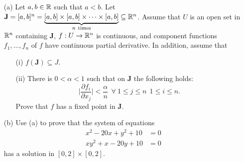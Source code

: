 \documentclass[a4paper]{article}
\begin{document}
\begin{problem}
   \begin{enumerate}
       \item[(a)] Let \( a,b \in \mathbb{R}  \) such that \( a < b  \). Let \( \textbf{J} = [a,b]^{n} = \underbrace{ [a,b] \times [a,b] \times \cdots \times [a,b]}_{n \ \text{times}} \subseteq \mathbb{R}^{n} \). Assume that \( U \) is an open set in \( \mathbb{R}^{n} \) containing \( \textbf{J} \), \( f: U \to \mathbb{R}^{n} \) is continuous, and component functions \( {f}_{1}, \dots, {f}_{n} \) of \( f  \) have continuous partial derivative. In addition, assume that 
           \begin{enumerate}
               \item[(i)] \( f(\textbf{J}) \subseteq J  \).
                \item[(ii)] There is \( 0 < \alpha < 1  \) such that on \( \textbf{J} \) the following holds:
                    \[ \Big| \frac{ \partial {f}_{i} }{  \partial {x}_{j} }  \Big|  < \frac{ \alpha }{ n } \ \ \forall \ 1 \leq j \leq n \ \ 1 \leq i \leq n.  \]
                    Prove that \( f \) has a fixed point in \( \textbf{J} \).
           \end{enumerate}
        \item[(b)] Use (a) to prove that the system of equations 
            \begin{align*}
                x^{2} - 20x + y^{2} + 10 &= 0  \\
                xy^{2} + x - 20y + 10 &= 0 
            \end{align*}
            has a solution in \( [0,2] \times [0,2] \).
   \end{enumerate} 
\end{problem}
\end{document}
